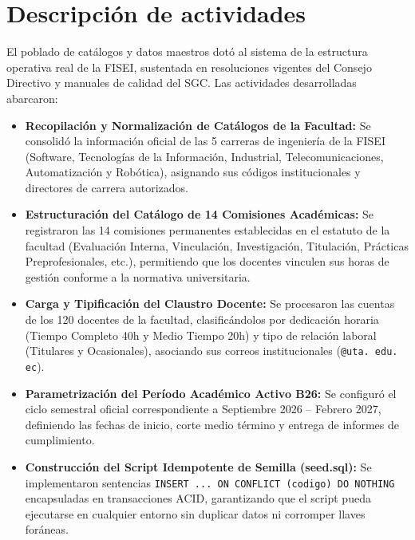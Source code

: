 \documentclass[12pt,a4paper]{article}
\begin{document}
\section{Descripción de actividades}
El poblado de catálogos y datos maestros dotó al sistema de la estructura operativa real de la FISEI, sustentada en resoluciones vigentes del Consejo Directivo y manuales de calidad del SGC. Las actividades desarrolladas abarcaron:

\begin{itemize}[leftmargin=1.5em, itemsep=4pt]
    \item \textbf{Recopilación y Normalización de Catálogos de la Facultad:} Se consolidó la información oficial de las 5 carreras de ingeniería de la FISEI (Software, Tecnologías de la Información, Industrial, Telecomunicaciones, Automatización y Robótica), asignando sus códigos institucionales y directores de carrera autorizados.
    \item \textbf{Estructuración del Catálogo de 14 Comisiones Académicas:} Se registraron las 14 comisiones permanentes establecidas en el estatuto de la facultad (Evaluación Interna, Vinculación, Investigación, Titulación, Prácticas Preprofesionales, etc.), permitiendo que los docentes vinculen sus horas de gestión conforme a la normativa universitaria.
    \item \textbf{Carga y Tipificación del Claustro Docente:} Se procesaron las cuentas de los 120 docentes de la facultad, clasificándolos por dedicación horaria (Tiempo Completo 40h y Medio Tiempo 20h) y tipo de relación laboral (Titulares y Ocasionales), asociando sus correos institucionales (\texttt{@uta. edu. ec}).
    \item \textbf{Parametrización del Período Académico Activo B26:} Se configuró el ciclo semestral oficial correspondiente a Septiembre 2026 -- Febrero 2027, definiendo las fechas de inicio, corte medio término y entrega de informes de cumplimiento.
    \item \textbf{Construcción del Script Idempotente de Semilla (seed.sql):} Se implementaron sentencias \texttt{INSERT ... ON CONFLICT (codigo) DO NOTHING} encapsuladas en transacciones ACID, garantizando que el script pueda ejecutarse en cualquier entorno sin duplicar datos ni corromper llaves foráneas.
\end{itemize}
\end{document}
